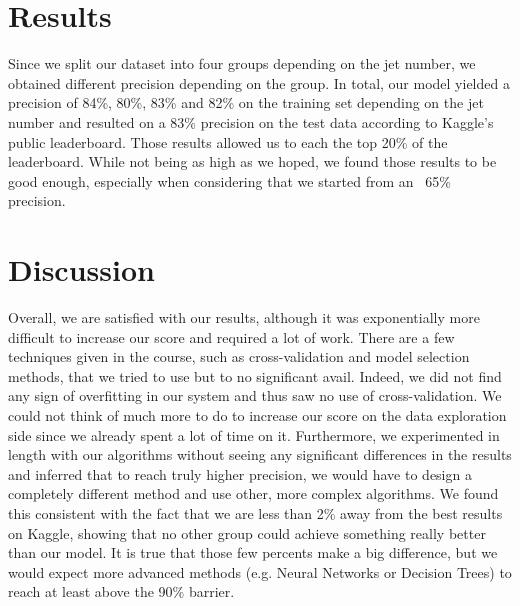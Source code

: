 \documentclass[10pt,conference,compsocconf]{IEEEtran}
\begin{document}
\section{Results}
 Since we split our dataset into four groups depending on the jet number, we obtained different precision depending on the group. In total, our model yielded a precision of 84\%, 80\%, 83\% and 82\% on the training set depending on the jet number and resulted on a 83\% precision on the test data according to Kaggle's public leaderboard. Those results allowed us to each the top 20\% of the leaderboard. While not being as high as we hoped, we found those results to be good enough, especially when considering that we started from an ~65\% precision.

\section{Discussion}
Overall, we are satisfied with our results, although it was exponentially more difficult to increase our score and required a lot of work. There are a few techniques given in the course, such as cross-validation and model selection methods, that we tried to use but to no significant avail. Indeed, we did not find any sign of overfitting in our system and thus saw no use of cross-validation.
We could not think of much more to do to increase our score on the data exploration side since we already spent a lot of time on it. Furthermore, we experimented in length with our algorithms without seeing any significant differences in the results and inferred that to reach truly higher precision, we would have to design a completely different method and use other, more complex algorithms. We found this consistent with the fact that we are less than 2\% away from the best results on Kaggle, showing that no other group could achieve something really better than our model. It is true that those few percents make a big difference, but we would expect more advanced methods (e.g. Neural Networks or Decision Trees) to reach at least above the 90\% barrier. 





\end{document}

